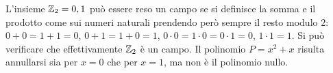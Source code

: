 \begin{example}
L'insieme ${\mathbb Z}_2={0,1}$ può essere reso un campo 
se si definisce la somma e il prodotto come sui 
numeri naturali prendendo però sempre il resto 
modulo $2$: $0+0=1+1=0$, $0+1=1+0=1$, $0\cdot 0
=1\cdot 0 = 0\cdot 1 = 0$, $1\cdot 1=1$.
Si può verificare che effettivamente ${\mathbb Z}_2$ 
è un campo.
Il polinomio $P = x^2+x$ risulta annullarsi sia 
per $x=0$ che per $x=1$, ma non è il polinomio nullo.
\end{example}


